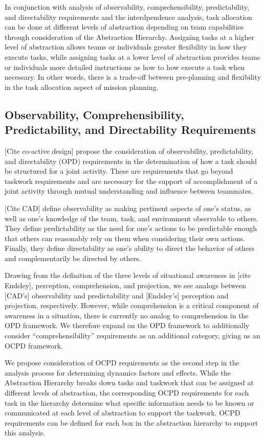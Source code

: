 \documentclass[letterpaper, 10 pt, conference]{ieeeconf}  %
\theoremstyle{definition}
\begin{document}
In conjunction with analysis of observability, comprehensibility, predictability, and directability requirements and the interdpendence analysis, task allocation can be done at different levels of abstraction depending on team capabilities through consideration of the Abstraction Hierarchy. Assigning tasks at a higher level of abstraction allows teams or individuals greater flexibility in how they execute tasks, while assigning tasks at a lower level of abstraction provides teams or individuals more detailed instructions as how to how execute a task when necessary. In other words, there is a trade-off between pre-planning and flexibility in the task allocation aspect of mission planning.

\subsection{Observability, Comprehensibility, Predictability, and Directability Requirements}
\label{sec:OCPD}
[Cite co-active design] propose the consideration of observability, predictability, and directability (OPD) requirements in the determination of how a task should be structured for a joint activity. These are requirements that go beyond taskwork requirements and are necessary for the support of accomplishment of a joint activity through mutual understanding and influence between teammates. 

[Cite CAD] define observability as making pertinent aspects of one’s status, as well as one’s knowledge of the team, task, and environment observable to others. They define predictability as the need for one’s actions to be predictable enough that others can reasonably rely on them when considering their own actions. Finally, they define directability as one’s ability to direct the behavior of others and complementarily be directed by others. 

Drawing from the definition of the three levels of situational awareness in [cite Endsley], perception, comprehension, and projection, we see analogs between [CAD's] observability and predictability and [Endsley's] perception and projection, respectively. However, while comprehension is a critical component of awareness in a situation, there is currently no analog to comprehension in the OPD framework. We therefore expand on the OPD framework to additionally consider ``comprehensibility'' requirements as an additional category, giving us an OCPD framework.

We propose consideration of OCPD requirements as the second step in the analysis process for determining dynamics factors and effects. While the Abstraction Hierarchy breaks down tasks and taskwork that can be assigned at different levels of abstraction, the corresponding OCPD requirements for each task in the hierarchy determine what specific information needs to be known or communicated at each level of abstraction to support the taskwork. OCPD requirements can be defined for each box in the abstraction hierarchy to support this analysis. %
\end{document}
